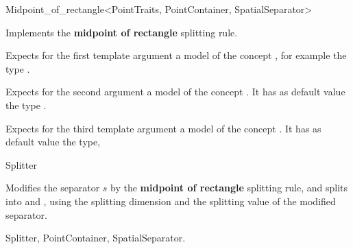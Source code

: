 

\begin{ccRefFunctionObjectClass}{Midpoint_of_rectangle<PointTraits, PointContainer, SpatialSeparator>}


\ccDefinition
Implements the {\bf midpoint of rectangle} splitting rule.

\ccParameters

Expects for the first template argument a model of
the concept , for example
the type . 

Expects for the second argument a model of the concept . It has as default value
the type .

Expects for the third template argument a model of the concept . It has as default value
the type, 


\ccIsModel

Splitter

\ccTypes



\ccOperations

{Modifies the separator $s$ by the {\bf midpoint of rectangle} splitting rule, 
and splits  into  and ,
using the splitting dimension and the splitting value of the modified separator.
}

\ccSeeAlso

Splitter, PointContainer, SpatialSeparator.
\end{ccRefFunctionObjectClass}





